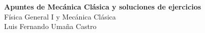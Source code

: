 \documentclass[../main.tex]{subfiles}
\begin{document}
\begin{center}
\vspace*{6cm}
{\Huge \textbf{Apuntes de Mecánica Clásica y soluciones de ejercicios} }\\
\vspace{3cm}
{Física General I y Mecánica Clásica\normalsize} \\
\vspace{4cm}
{\LARGE Luis Fernando Umaña Castro} \\
\vspace{5.3cm} 
 \vspace{6mm}
\end{center}

\end{document}
